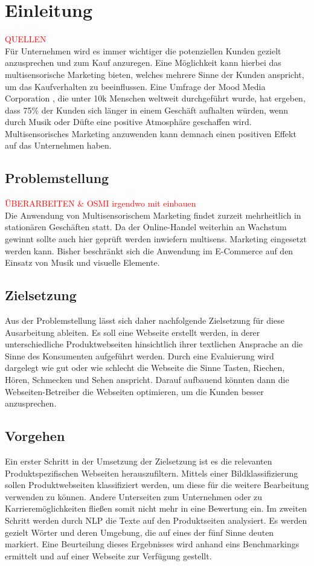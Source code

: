 \section{Einleitung}  \textcolor{red}{QUELLEN} \\
Für Unternehmen wird es immer wichtiger die potenziellen Kunden gezielt anzusprechen und zum Kauf anzuregen. Eine Möglichkeit kann hierbei das multisensorische Marketing bieten, welches mehrere Sinne der Kunden anspricht, um das Kaufverhalten zu beeinflussen. Eine Umfrage der Mood Media Corporation , die unter 10k Menschen weltweit durchgeführt wurde, hat ergeben, dass 75\% der Kunden sich länger in einem Geschäft aufhalten würden, wenn durch Musik oder Düfte eine positive Atmosphäre geschaffen wird.
Multisensorisches Marketing anzuwenden kann demnach einen positiven Effekt auf das Unternehmen haben.

\subsection{Problemstellung}
\textcolor{red}{ÜBERARBEITEN \& OSMI irgendwo mit einbauen} \\
Die Anwendung von Multisensorischem Marketing findet zurzeit mehrheitlich in stationären Geschäften statt. Da der Online-Handel weiterhin an Wachstum gewinnt sollte auch hier geprüft werden inwiefern multisens. Marketing eingesetzt werden kann.
Bisher beschränkt sich die Anwendung im E-Commerce auf den Einsatz von Musik und visuelle Elemente.

\subsection{Zielsetzung}
Aus der Problemstellung lässt sich daher nachfolgende Zielsetzung für diese Ausarbeitung ableiten. Es soll eine Webseite erstellt werden, in derer unterschiedliche Produktwebseiten hinsichtlich ihrer textlichen Ansprache an die Sinne des Konsumenten aufgeführt werden. Durch eine Evaluierung wird dargelegt wie gut oder wie schlecht die Webseite die Sinne Tasten, Riechen, Hören, Schmecken und Sehen anspricht.
Darauf aufbauend könnten dann die Webseiten-Betreiber die Webseiten optimieren, um die Kunden besser anzusprechen.

\subsection{Vorgehen}
Ein erster Schritt in der Umsetzung der Zielsetzung ist es die relevanten Produktspezifischen Webseiten herauszufiltern. Mittels einer Bildklassifizierung sollen Produktwebseiten klassifiziert werden, um diese für die weitere Bearbeitung verwenden zu können. Andere Unterseiten zum Unternehmen oder zu Karrieremöglichkeiten fließen somit nicht mehr in eine Bewertung ein. Im zweiten Schritt werden durch \acf{NLP} die Texte auf den Produktseiten analysiert. Es werden gezielt Wörter und deren Umgebung, die auf eines der fünf Sinne deuten markiert.
Eine Beurteilung dieses Ergebnisses wird anhand eins Benchmarkings ermittelt und auf einer Webseite zur Verfügung gestellt.

